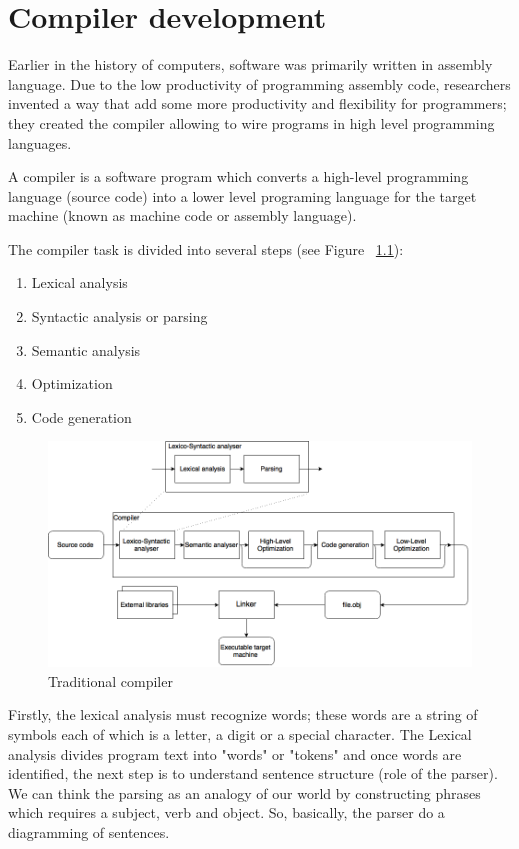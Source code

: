 \documentclass[
  oneside,
  11pt, a4paper,
  footinclude=true,
  headinclude=true,
  cleardoublepage=empty
]{scrbook}
\begin{document}
\chapter{Compiler development}
Earlier in the history of computers, software was primarily written in assembly language. Due to the low productivity of programming assembly code, researchers invented a way that add some more productivity and flexibility for programmers; they created the compiler allowing to wire programs in high level programming languages.

A compiler is a software program which converts a high-level programming language (source code) into a lower level programing language for the target machine (known as machine code or assembly language).

The compiler task is divided into several steps (see Figure ~\ref{fig:compiler}):
\begin{enumerate}
  \item Lexical analysis
  \item Syntactic analysis or parsing
  \item Semantic analysis
  \item Optimization
  \item Code generation
\end{enumerate}

\begin{figure}
\begin{center}
       \includegraphics[width=1\textwidth]{img/compiler.png}
\end{center}
\caption{Traditional compiler}
\label{fig:compiler}
\end{figure}
Firstly, the lexical analysis must recognize words; these words are a string of symbols each of which is a letter, a digit or a special character.
The Lexical analysis divides program text into "words" or "tokens" and once words are identified, the next step is to understand sentence structure (role of the parser).
We can think the parsing as an analogy of our world by constructing phrases which requires a subject, verb and object. So, basically, the parser do a diagramming of sentences. %
\end{document}
